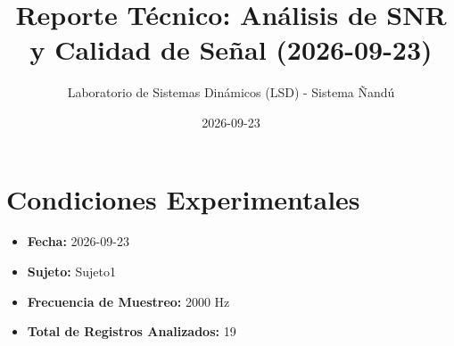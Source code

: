 \documentclass[11pt,a4paper]{article}
\title{\textbf{Reporte Técnico: Análisis de SNR y Calidad de Señal (2026-09-23)}}
\author{Laboratorio de Sistemas Dinámicos (LSD) - Sistema Ñandú}
\date{2026-09-23}
\begin{document}
\maketitle

\tableofcontents
\newpage
\section{Condiciones Experimentales}
\begin{itemize}
    \item \textbf{Fecha:} 2026-09-23
    \item \textbf{Sujeto:} Sujeto1
    \item \textbf{Frecuencia de Muestreo:} 2000 Hz
    \item \textbf{Total de Registros Analizados:} 19
\end{itemize}
\end{document}
